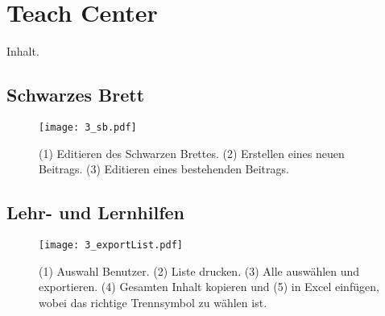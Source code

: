 \chapter{Teach Center}

Inhalt.

\section{Schwarzes Brett}

\begin{figure}[htbp]
  \texttt{[image: 3\_sb.pdf]}
  \caption{ (1) Editieren des Schwarzen Brettes. (2) Erstellen eines neuen
    Beitrags. (3) Editieren eines bestehenden Beitrags.}
\end{figure}

\section{Lehr- und Lernhilfen}

\begin{figure}[htbp]
  \texttt{[image: 3\_exportList.pdf]}
  \caption{ (1) Auswahl Benutzer. (2) Liste drucken. (3) Alle ausw\"{a}hlen und
    exportieren. (4) Gesamten Inhalt kopieren und (5) in Excel einf\"{u}gen,
    wobei das richtige Trennsymbol zu w\"{a}hlen ist.}
\end{figure}

